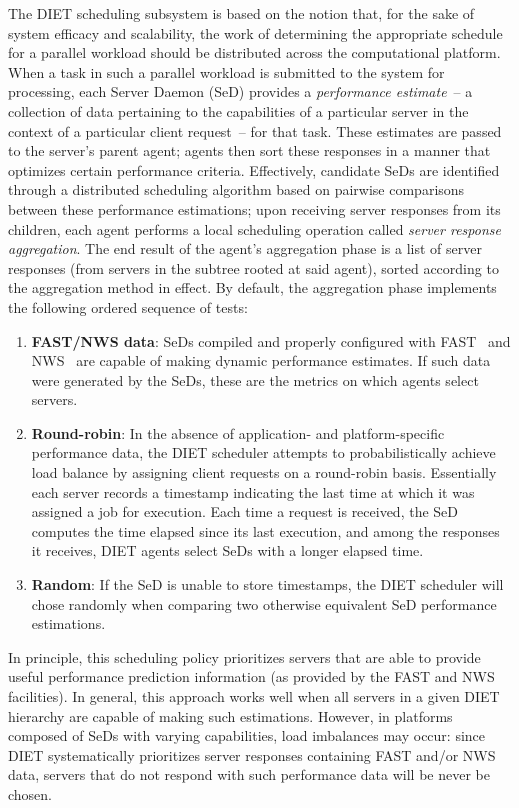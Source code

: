 The DIET scheduling subsystem is based on the notion that, for the
sake of system efficacy and scalability, the work of
determining the appropriate schedule for a parallel workload should be
distributed across the computational platform.  When a task in
such a parallel workload is submitted to the system for processing,
each Server Daemon (SeD) provides a
\emph{performance estimate}~-- a collection of data pertaining to
the capabilities of a particular server in the context of a particular
client request~-- for that task.  These estimates are
passed to the server's parent agent; agents then
sort these responses in a manner that optimizes certain performance
criteria.
Effectively, candidate SeDs are identified through a distributed
scheduling algorithm based on
pairwise comparisons between these
performance estimations; upon receiving server responses from its
children, each agent performs a local scheduling operation called
\emph{server response aggregation}.  The end result of the agent's
aggregation phase is a list of server responses (from servers in the
subtree rooted at said agent), sorted according to the
aggregation method in effect.
By default, the aggregation phase
implements the following ordered sequence of tests:

\begin{enumerate}
\item \textbf{FAST/NWS data}: SeDs compiled and properly configured with
  FAST~\cite{Qui02} and
  NWS~\cite{WSH99}
  are capable of making dynamic
  performance estimates.  If such data
  were generated by the SeDs, these are the metrics on which agents
  select servers.
\item \textbf{Round-robin}: In the absence of application- and
  platform-specific performance
  data, the DIET scheduler attempts to probabilistically achieve load
  balance by assigning client requests on a round-robin
  basis.  Essentially each server records a timestamp indicating the
  last time at which it was assigned a job for execution.  Each time a
  request is received, the SeD computes the time elapsed since its
  last execution, and among the responses it receives, DIET agents
  select SeDs with a longer elapsed time.
\item \textbf{Random}: If the SeD is unable to store
  timestamps, the DIET scheduler will chose randomly when
  comparing two otherwise equivalent SeD performance estimations.
\end{enumerate}

In principle, this scheduling policy prioritizes servers that are able
to provide useful performance prediction information (as provided by
the FAST and NWS facilities).  In general, this approach works well
when all servers in a given DIET hierarchy are capable of making such
estimations.  However, in platforms composed of SeDs with varying
capabilities, load imbalances may occur: since DIET systematically
prioritizes server responses containing FAST and/or NWS data, servers
that do not respond with such performance data will be never be
chosen.

